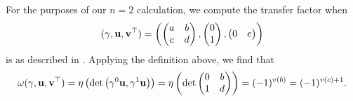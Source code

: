 For the purposes of our $n=2$ calculation, we compute the transfer factor when
\[ {(\gamma, \mathbf u, \mathbf v^\top)} = \left( \begin{pmatrix} a & b \\ c & d \end{pmatrix},
  \begin{pmatrix} 0 \\ 1 \end{pmatrix}, \begin{pmatrix} 0 & e \end{pmatrix} \right) \]
is as described in .
Applying the definition above, we find that
\begin{equation}
    \omega{(\gamma, \mathbf u, \mathbf v^\top)}
    = \eta\left( \det
      \left( \gamma^0 \mathbf u, \gamma^1 \mathbf u \right)
    \right)
    = \eta\left( \det
      \begin{pmatrix} 0 & b \\ 1 & d \end{pmatrix}
    \right)
    = (-1)^{v(b)} = (-1)^{v(c)+1}.
  \label{eq:semi_lie_transfer}
\end{equation}

